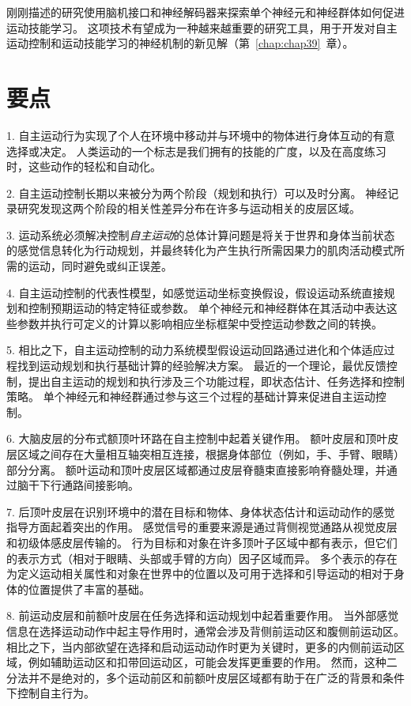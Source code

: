 刚刚描述的研究使用脑机接口和神经解码器来探索单个神经元和神经群体如何促进运动技能学习。
这项技术有望成为一种越来越重要的研究工具，用于开发对自主运动控制和运动技能学习的神经机制的新见解（第~\ref{chap:chap39}~章）。



\section{要点}

1. 自主运动行为实现了个人在环境中移动并与环境中的物体进行身体互动的有意选择或决定。
人类运动的一个标志是我们拥有的技能的广度，以及在高度练习时，这些动作的轻松和自动化。


2. 自主运动控制长期以来被分为两个阶段（规划和执行）可以及时分离。
神经记录研究发现这两个阶段的相关性差异分布在许多与运动相关的皮层区域。


3. 运动系统必须解决控制\textit{自主运动}的总体计算问题是将关于世界和身体当前状态的感觉信息转化为行动规划，并最终转化为产生执行所需因果力的肌肉活动模式所需的运动，同时避免或纠正误差。


4. 自主运动控制的代表性模型，如感觉运动坐标变换假设，假设运动系统直接规划和控制预期运动的特定特征或参数。
单个神经元和神经群体在其活动中表达这些参数并执行可定义的计算以影响相应坐标框架中受控运动参数之间的转换。


5. 相比之下，自主运动控制的动力系统模型假设运动回路通过进化和个体适应过程找到运动规划和执行基础计算的经验解决方案。
最近的一个理论，最优反馈控制，提出自主运动的规划和执行涉及三个功能过程，即状态估计、任务选择和控制策略。
单个神经元和神经群通过参与这三个过程的基础计算来促进自主运动控制。


6. 大脑皮层的分布式额顶叶环路在自主控制中起着关键作用。
额叶皮层和顶叶皮层区域之间存在大量相互轴突相互连接，根据身体部位（例如，手、手臂、眼睛）部分分离。
额叶运动和顶叶皮层区域都通过皮层脊髓束直接影响脊髓处理，并通过脑干下行通路间接影响。


7. 后顶叶皮层在识别环境中的潜在目标和物体、身体状态估计和运动动作的感觉指导方面起着突出的作用。
感觉信号的重要来源是通过背侧视觉通路从视觉皮层和初级体感皮层传输的。
行为目标和对象在许多顶叶子区域中都有表示，但它们的表示方式（相对于眼睛、头部或手臂的方向）因子区域而异。
多个表示的存在为定义运动相关属性和对象在世界中的位置以及可用于选择和引导运动的相对于身体的位置提供了丰富的基础。


8. 前运动皮层和前额叶皮层在任务选择和运动规划中起着重要作用。
当外部感觉信息在选择运动动作中起主导作用时，通常会涉及背侧前运动区和腹侧前运动区。
相比之下，当内部欲望在选择和启动运动动作时更为关键时，更多的内侧前运动区域，例如辅助运动区和扣带回运动区，可能会发挥更重要的作用。
然而，这种二分法并不是绝对的，多个运动前区和前额叶皮层区域都有助于在广泛的背景和条件下控制自主行为。


